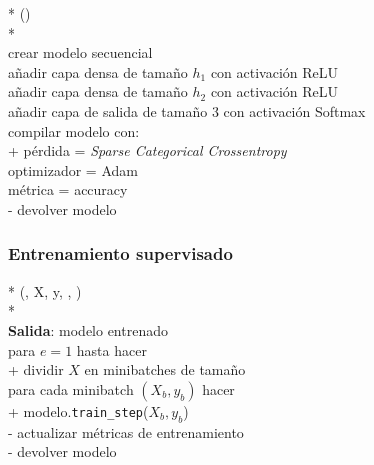 \documentclass[conference,a4paper]{IEEEtran}
\begin{document}
\begin{center}
\begin{minipage}{0.95\linewidth}
\small
\begin{pseudo}*
  () \\*
   \\
  crear modelo secuencial \\
  añadir capa densa de tamaño \(h_1\) con activación ReLU \\
  añadir capa densa de tamaño \(h_2\) con activación ReLU \\
  añadir capa de salida de tamaño 3 con activación Softmax \\
  compilar modelo con: \\+
    pérdida = \textit{Sparse Categorical Crossentropy} \\
    optimizador = Adam \\
    métrica = accuracy \\-
  devolver modelo
\end{pseudo}
\label{pcd:arquitecturaRed}
\end{minipage}
\end{center}

\subsubsection{Entrenamiento supervisado}

\begin{center}
\begin{minipage}{0.95\linewidth}
\small
\begin{pseudo}*
  (, X, y, , ) \\*
   \\
  \textbf{Salida}: modelo entrenado \\
  para \( e = 1 \) hasta  hacer \\+
    dividir \( X \) en minibatches de tamaño  \\
    para cada minibatch \( (X_b, y_b) \) hacer \\+
      modelo.\texttt{train\_step}($X_b, y_b$) \\-
    actualizar métricas de entrenamiento \\-
  devolver modelo
\end{pseudo}
\label{pcd:entrenamientoRed}
\end{minipage}
\end{center}
\end{document}
